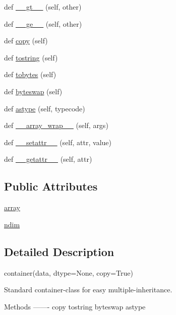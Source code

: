 \begin{DoxyCompactItemize}
def \hyperlink{classnumpy_1_1lib_1_1user__array_1_1container_ac6e2a713a37a1eace84d720cbf25a39d}{\+\_\+\+\_\+gt\+\_\+\+\_\+} (self, other)
\item 
def \hyperlink{classnumpy_1_1lib_1_1user__array_1_1container_a40aae4d4f56aeb8e6bdd41a53cecb1ab}{\+\_\+\+\_\+ge\+\_\+\+\_\+} (self, other)
\item 
def \hyperlink{classnumpy_1_1lib_1_1user__array_1_1container_a27c75007f2cb7828ce092a7514e969fb}{copy} (self)
\item 
def \hyperlink{classnumpy_1_1lib_1_1user__array_1_1container_a20f199cbf6b814b28a4dcea28a9aea94}{tostring} (self)
\item 
def \hyperlink{classnumpy_1_1lib_1_1user__array_1_1container_a8b107832c187e8dcedbc1eaf692671bc}{tobytes} (self)
\item 
def \hyperlink{classnumpy_1_1lib_1_1user__array_1_1container_ab895f93952c009a82785f8fbeca4622d}{byteswap} (self)
\item 
def \hyperlink{classnumpy_1_1lib_1_1user__array_1_1container_a13e1b5a2c4db869913f62b61521e952f}{astype} (self, typecode)
\item 
def \hyperlink{classnumpy_1_1lib_1_1user__array_1_1container_a069442358c838bb0cfeb9a9ba5aef57f}{\+\_\+\+\_\+array\+\_\+wrap\+\_\+\+\_\+} (self, args)
\item 
def \hyperlink{classnumpy_1_1lib_1_1user__array_1_1container_afe26f0205e1bfae1be4e3dcb650da0ca}{\+\_\+\+\_\+setattr\+\_\+\+\_\+} (self, attr, value)
\item 
def \hyperlink{classnumpy_1_1lib_1_1user__array_1_1container_a1376357e059d6fb03bcb20fca8429ed3}{\+\_\+\+\_\+getattr\+\_\+\+\_\+} (self, attr)
\end{DoxyCompactItemize}
\subsection*{Public Attributes}
\begin{DoxyCompactItemize}
\item 
\hyperlink{classnumpy_1_1lib_1_1user__array_1_1container_ad6a4f8bd556fc1b26ed016e64b5d094d}{array}
\item 
\hyperlink{classnumpy_1_1lib_1_1user__array_1_1container_af23d369a4814f3802177a58e6c6afc7e}{ndim}
\end{DoxyCompactItemize}


\subsection{Detailed Description}
\begin{DoxyVerb}container(data, dtype=None, copy=True)

Standard container-class for easy multiple-inheritance.

Methods
-------
copy
tostring
byteswap
astype\end{DoxyVerb}
 

